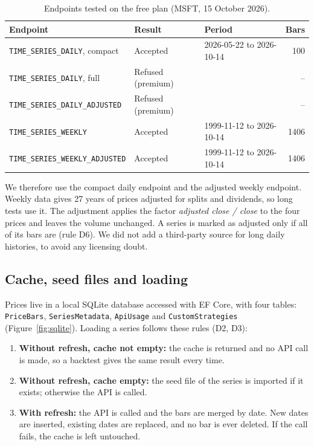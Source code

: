 \documentclass[11pt,a4paper]{article}
\newcommand{\code}[1]{\texttt{\small #1}}
\begin{document}
\begin{table}[H]
\centering\small
\begin{tabular}{lllr}
\toprule
\textbf{Endpoint} & \textbf{Result} & \textbf{Period} & \textbf{Bars} \\
\midrule
\code{TIME\_SERIES\_DAILY}, compact & Accepted & 2026-05-22 to 2026-10-14 & 100 \\
\code{TIME\_SERIES\_DAILY}, full & Refused (premium) & & -- \\
\code{TIME\_SERIES\_DAILY\_ADJUSTED} & Refused (premium) & & -- \\
\code{TIME\_SERIES\_WEEKLY} & Accepted & 1999-11-12 to 2026-10-14 & 1406 \\
\code{TIME\_SERIES\_WEEKLY\_ADJUSTED} & Accepted & 1999-11-12 to 2026-10-14 & 1406 \\
\bottomrule
\end{tabular}
\caption{Endpoints tested on the free plan (MSFT, 15 October 2026).}
\label{tab:spike}
\end{table}

We therefore use the compact daily endpoint and the adjusted weekly endpoint. Weekly data gives 27 years of prices adjusted for splits and dividends, so long tests use it. The adjustment applies the factor \textit{adjusted close / close} to the four prices and leaves the volume unchanged. A series is marked as adjusted only if all of its bars are (rule D6). We did not add a third-party source for long daily histories, to avoid any licensing doubt.

\subsection{Cache, seed files and loading}

Prices live in a local SQLite database accessed with EF Core, with four tables: \code{PriceBars}, \code{SeriesMetadata}, \code{ApiUsage} and \code{CustomStrategies} (Figure~\ref{fig:sqlite}). Loading a series follows these rules (D2, D3):

\begin{enumerate}
\item \textbf{Without refresh, cache not empty:} the cache is returned and no API call is made, so a backtest gives the same result every time.
\item \textbf{Without refresh, cache empty:} the seed file of the series is imported if it exists; otherwise the API is called.
\item \textbf{With refresh:} the API is called and the bars are merged by date. New dates are inserted, existing dates are replaced, and no bar is ever deleted. If the call fails, the cache is left untouched.
\end{enumerate}
\end{document}
